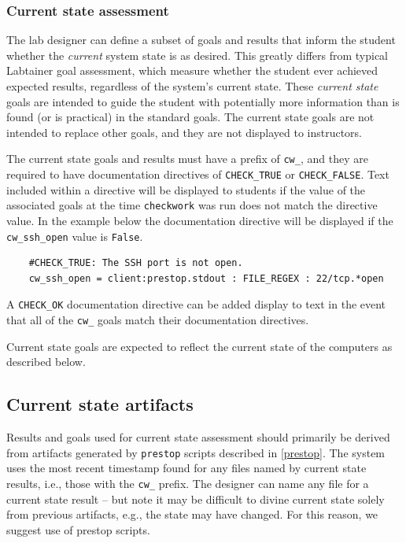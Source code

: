 \documentclass[12pt]{article}
\begin{document}
\subsubsection {Current state assessment}
\label{current-state}
The lab designer can define a subset of goals and results that inform the student
whether the \textit{current} system state is as desired.  This greatly differs
from typical Labtainer goal assessment, which measure whether the student ever
achieved expected results, regardless of the system's current state.  These 
\textit{current state} goals are intended to guide the student with potentially
more information than is found (or is practical) in the standard goals.  The current state goals
are not intended to replace other goals, and they are not displayed to instructors.

The current state goals and results must have a prefix of {\tt cw\_}, and they
are required to have documentation directives of {\tt CHECK\_TRUE} or {\tt CHECK\_FALSE}.
Text included within a directive will be displayed to students if the value
of the associated goals at the time {\tt checkwork} was run does not match the directive value.  
In the example below the documentation directive will be displayed if the {\tt cw\_ssh\_open}
value is {\tt False}.
\begin{verbatim}
    #CHECK_TRUE: The SSH port is not open. 
    cw_ssh_open = client:prestop.stdout : FILE_REGEX : 22/tcp.*open
\end{verbatim}
\noindent A {\tt CHECK\_OK} documentation directive can be added display to text in the event that
all of the {\tt cw\_} goals match their documentation directives.

Current state goals
are expected to reflect the current state of the computers as described below.

\subsection {Current state artifacts}
Results and goals used for current state assessment should primarily be derived from artifacts generated by {\tt prestop} scripts 
described in \ref{prestop}.  The system uses the most recent timestamp found for any files named by current state
results, i.e., those with the {\tt cw\_} prefix.  The designer can name any file for a current state result -- but note it may
be difficult to divine current state solely from previous artifacts, e.g., the state may have changed.  For this reason, we
suggest use of prestop scripts.
\end{document}
